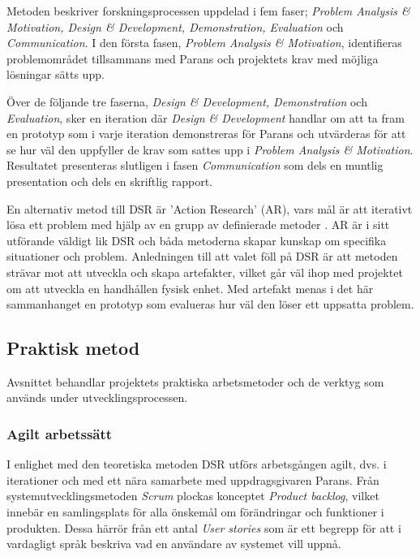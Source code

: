 \documentclass{article}
\begin{document}
            \noindent Metoden beskriver forskningsprocessen uppdelad i fem faser; 
            \textit{Problem Analysis \& Motivation, Design \& Development, Demonstration, Evaluation} och \textit{Communication}. 
            I den första fasen, \textit{Problem Analysis \& Motivation}, identifieras problemområdet tillsammans med Parans och projektets krav med möjliga lösningar sätts upp. \bigskip

            \noindent Över de följande tre faserna, \textit{Design \& Development, Demonstration} och \textit{Evaluation}, sker en iteration där \textit{Design \& Development} handlar om att ta fram en prototyp som i varje iteration demonstreras för Parans och utvärderas för att se hur väl den uppfyller de krav som sattes upp i \textit{Problem Analysis \& Motivation}. Resultatet presenteras slutligen i fasen \emph{Communication} som dels en muntlig presentation och dels en skriftlig rapport. \bigskip

            \noindent En alternativ metod till DSR är 'Action Research' (AR), vars mål är att iterativt lösa ett problem med hjälp av en grupp av definierade metoder \cite{actionresearch}. AR är i sitt utförande väldigt lik DSR \cite{designscience} och båda metoderna skapar kunskap om specifika situationer och problem. Anledningen till att valet föll på DSR är att metoden strävar mot att utveckla och skapa artefakter, vilket går väl ihop med projektet om att utveckla en handhållen fysisk enhet. 
            Med artefakt menas i det här sammanhanget en prototyp som evalueras hur väl den löser ett uppsatta problem. 

        \newpage

        \subsection{Praktisk metod} %
        \label{sub:praktiskmetod}
            Avsnittet behandlar projektets praktiska arbetsmetoder och de verktyg som används under utvecklingsprocessen.

            \subsubsection{Agilt arbetssätt} %
            \label{subsub:agilt}
            I enlighet med den teoretiska metoden DSR utförs arbetsgången agilt, dvs. i iterationer och med ett nära samarbete med uppdragsgivaren Parans.
            Från systemutvecklingsmetoden \hbox{\textit{Scrum}} plockas konceptet \textit{Product backlog}, vilket innebär en samlingsplats för alla önskemål om förändringar och funktioner i produkten.
            Dessa härrör från ett antal \textit{User stories} som är ett begrepp för att i vardagligt språk beskriva vad en användare av systemet vill uppnå.\\
\end{document}
